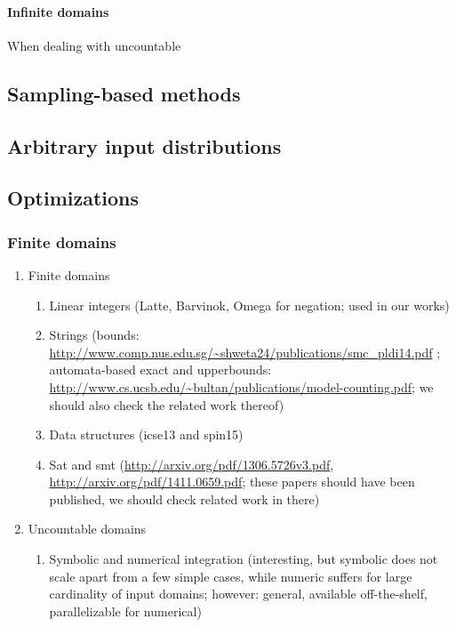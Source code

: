 \paragraph{Infinite domains}
When dealing with uncountable



\subsection{Sampling-based methods}\label{sec:computingprobabilitiesSampling}

\subsection{Arbitrary input distributions}\label{sec:computingprobabilitiesInputDistributions}

\subsection{Optimizations}\label{sec:computingprobabilitiesOptimizations}



\subsubsection{Finite domains}\label{sec:exactComputationFinite}

	\begin{enumerate}
		\item Finite domains
			\begin{enumerate}
				\item Linear integers (Latte, Barvinok, Omega for negation; used in our works)
				\item Strings (bounds: \url{http://www.comp.nus.edu.sg/~shweta24/publications/smc\_pldi14.pdf} ; automata-based exact and upperbounds: \url{http://www.cs.ucsb.edu/~bultan/publications/model-counting.pdf}; we should also check the related work thereof)
				\item Data structures (icse13 and spin15)
				\item Sat and smt (\url{http://arxiv.org/pdf/1306.5726v3.pdf}, \url{http://arxiv.org/pdf/1411.0659.pdf}; these papers should have been published, we should check related work in there)
			\end{enumerate}
		
		\item Uncountable domains
			\begin{enumerate}
				\item Symbolic and numerical integration (interesting, but symbolic does not scale apart from a few simple cases, while numeric suffers for large cardinality of input domains; however: general, available off-the-shelf, parallelizable for numerical)
			\end{enumerate}
	\end{enumerate}


